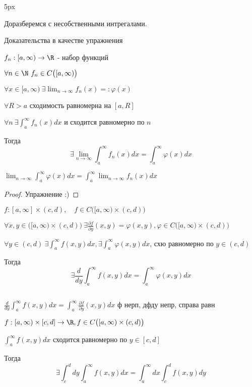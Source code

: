 
\parindent 5px

\usepackage{amsfonts, amssymb, amsmath, mathtools, amsthm}  %
\usepackage{mathrsfs}


\renewcommand{\baselinestretch}{1.3} 
\setcounter{theorem}{6}


  Доразберемся с несобственными интрегалами.

  Доказательства в качестве упражнения

  \begin{theorem}
    $f_n: [a, \infty) \to \R$ - набор функций
    
    $\forall n \in \N \ f_n \in C\big([a, \infty)\big)$

    $\forall x \in [a, \infty) \ \exists \lim_{n\to\infty}f_n(x) =: \varphi(x)$

    $\forall R > a $ сходимость равномерна на $[a, R]$

    $\forall n \ \exists \int^\infty_a f_n(x)dx$ и сходится равномерно по $n$

    Тогда $$\exists \lim_{n\to\infty} \int^\infty_a f_n(x)dx = \int^\infty_a \varphi(x)dx$$

    $\lim_{n\to\infty}\int^\infty_a \varphi(x)dx = \int^\infty_a \lim_{n\to\infty}f_n(x)dx$
  \end{theorem}
  \begin{proof}
    Упражнение :)
  \end{proof}

  \begin{theorem}
    $f:[a, \infty]\times(c,d), \quad f \in C\big([a, \infty) \times (c,d)\big)$

    $\forall x,y \in \big([a, \infty)\times(c,d)\big) \ \exists \frac{\partial f}{\partial y}(x,y) = \varphi(x,y), \varphi \in C\big([a, \infty)\times(c,d)\big)$

    $\forall y \in (c,d) \ \exists \int^\infty_a f(x,y)dx, \exists \int^\infty_a \varphi(x,y)dx$, схю равномерно по $y \in (c,d)$

    Тогда $$\exists \frac{d}{dy}\int^\infty_a f(x,y)dx = \int^\infty_a \varphi(x,y )dx$$

    \par $ $

    $\frac{d}{dy}\int^\infty_a f(x,y)dx = \int^\infty_a \frac{\partial f}{\partial y}(x,y)dx$ ф нерп, дфду непр, справа равн


  \end{theorem}

  \begin{theorem}
    $f: [a, \infty) \times [c,d] \to \R, f \in C\big([a, \infty) \times (c,d)\big)$

    $\int^\infty_a f(x,y)dx $ сходится равномерно по $y \in [c,d]$

    Тогда $$\exists \int_c^d dy \int_a^\infty f(x,y) dx = \int^\infty_a dx \int^d_c f(x,y)dy$$
  \end{theorem}


